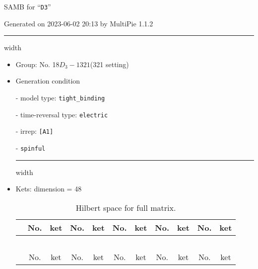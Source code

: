 \documentclass[fleqn,10pt,landscape]{article}
\begin{document}
\setcounter{MaxMatrixCols}{16}

\setlength{\baselineskip}{16pt}
\footnotesize
\begin{center}
\LARGE
SAMB for ``\texttt{D3}''
\end{center}
\begin{flushright}
Generated on 2023-06-02 20:13 by MultiPie 1.1.2
\end{flushright}
\vspace{1cm}


 \hfil \hrule height 1mm width \textwidth \hfil

\begin{itemize}
\item Group: No. 18\quad$D_{3}-1$\quad$321$\quad(321 setting)\quad[ trigonal ]

\vspace{5mm}

\item Generation condition

\quad - model type: \texttt{tight_binding}

\quad - time-reversal type: \texttt{electric}

\quad - irrep: \texttt{[A1]}

\quad - \texttt{spinful}


 \hfil \hrule height 1mm width \textwidth \hfil

\item Kets: dimension = 48
\begin{center}
\renewcommand{\arraystretch}{1.3}
\begin{longtable}{c|cc|cc|cc|cc|cc}
\caption{Hilbert space for full matrix.}
 \\
 \hline \hline
 & No. & ket & No. & ket & No. & ket & No. & ket & No. & ket \\ \hline \endfirsthead

\multicolumn{10}{l}{\tablename\ \thetable{}} \\
 \hline \hline
 & No. & ket & No. & ket & No. & ket & No. & ket & No. & ket \\ \hline \endhead


\end{longtable}
\end{center}
\end{itemize}
\end{document}
